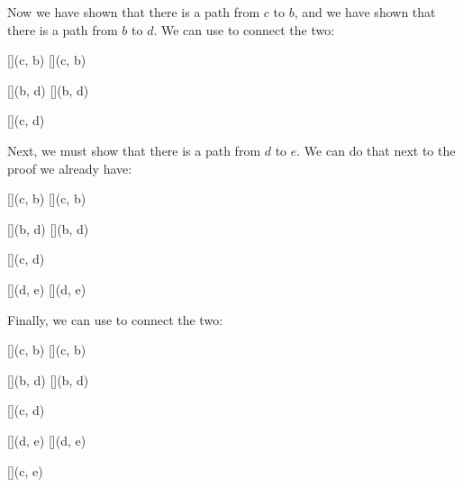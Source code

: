 \documentclass[../../../main.tex]{subfiles}
\begin{document}
\noindent
Now we have shown that there is a path from $c$ to $b$, and we have shown that there is a path from $b$ to $d$. We can use  to connect the two:

\begin{prooftree*}

  []{(c, b)}
  []{(c, b)} 
  
  []{(b, d)}
  []{(b, d)}   

  []{(c, d)}
  
\end{prooftree*}

\noindent
Next, we must show that there is a path from $d$ to $e$. We can do that next to the proof we already have:

\begin{prooftree*}

  []{(c, b)}
  []{(c, b)} 
  
  []{(b, d)}
  []{(b, d)}   

  []{(c, d)}
  
  []{(d, e)}
  []{(d, e)}   

  
\end{prooftree*}

\noindent
Finally, we can use  to connect the two:

\begin{prooftree*}

  []{(c, b)}
  []{(c, b)} 
  
  []{(b, d)}
  []{(b, d)}   

  []{(c, d)}
  
  []{(d, e)}
  []{(d, e)}   

  []{(c, e)}  
  
\end{prooftree*}
\end{document}
